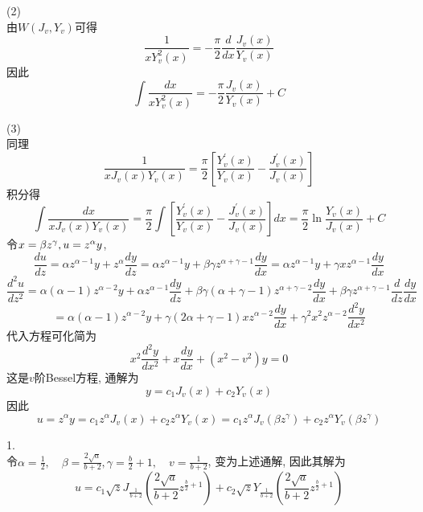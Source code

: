 \documentclass[UTF8,9pt]{ctexart}
\begin{document}
(2)\\
由$W\left(J_{v}, Y_{v}\right)$可得 $$ 
\frac{1}{x Y_{v}^{2}(x)}=-\frac{\pi}{2} \frac{d}{d x} \frac{J_{v}(x)}{Y_{v}(x)}
$$
因此$$ 
\int \frac{d x}{x Y_{v}^{2}(x)}=-\frac{\pi}{2} \frac{J_{v}(x)}{Y_{v}(x)}+C
$$

(3)\\
同理$$ 
\frac{1}{x J_{v}(x) Y_{v}(x)}=\frac{\pi}{2}\left[\frac{Y_{v}^{\prime}(x)}{Y_{v}(x)}-\frac{J_{v}^{\prime}(x)}{J_{v}(x)}\right]
$$
积分得
$$ 
\int \frac{d x}{x J_{v}(x) Y_{v}(x)}=\frac{\pi}{2} \int\left[\frac{Y_{v}^{\prime}(x)}{Y_{v}(x)}-\frac{J_{v}^{\prime}(x)}{J_{v}(x)}\right] d x=\frac{\pi}{2} \ln \frac{Y_{v}(x)}{J_{v}(x)}+C
$$
令$x = \beta z^\gamma,u=z^\alpha y$,
$$ 
\frac{d u}{d z}=\alpha z^{\alpha-1} y+z^{\alpha} \frac{d y}{d z}=\alpha z^{\alpha-1} y+\beta \gamma z^{\alpha+\gamma-1} \frac{d y}{d x}=\alpha z^{\alpha-1} y+\gamma x z^{\alpha-1} \frac{d y}{d x}
$$$$ 
\frac{d^{2} u}{d z^{2}}=\alpha(\alpha-1) z^{\alpha-2} y+\alpha z^{\alpha-1} \frac{d y}{d z}+\beta \gamma(\alpha+\gamma-1) z^{\alpha+\gamma-2} \frac{d y}{d x}+\beta \gamma z^{\alpha+\gamma-1} \frac{d}{d z} \frac{d y}{d x}
$$$$ 
=\alpha(\alpha-1) z^{\alpha-2} y+\gamma(2 \alpha+\gamma-1) x z^{\alpha-2} \frac{d y}{d x}+\gamma^{2} x^{2} z^{\alpha-2} \frac{d^{2} y}{d x^{2}}
$$
代入方程可化简为
$$ 
x^{2} \frac{d^{2} y}{d x^{2}}+x \frac{d y}{d x}+\left(x^{2}-v^{2}\right) y=0
$$
这是$v$阶Bessel方程, 通解为
$$ 
y=c_{1} J_{v}(x)+c_{2} Y_{v}(x)
$$因此$$ 
u=z^{\alpha} y=c_{1} z^{\alpha} J_{v}(x)+c_{2} z^{\alpha} Y_{v}(x)=c_{1} z^{\alpha} J_{v}\left(\beta z^{\gamma}\right)+c_{2} z^{\alpha} Y_{v}\left(\beta z^{\gamma}\right)
$$

1.\\
令$\alpha=\frac{1}{2}, \quad \beta=\frac{2 \sqrt{a}}{b+2}, \gamma=\frac{b}{2}+1, \quad v=\frac{1}{b+2}$, 变为上述通解, 因此其解为
$$u=c_{1} \sqrt{z} J_{\frac{1}{b+2}}\left(\frac{2 \sqrt{a}}{b+2} z^{\frac{b}{2}+1}\right)+c_{2} \sqrt{z} Y_{\frac{1}{b+2}}\left(\frac{2 \sqrt{a}}{b+2} z^{\frac{b}{2}+1}\right)$$
\end{document}
